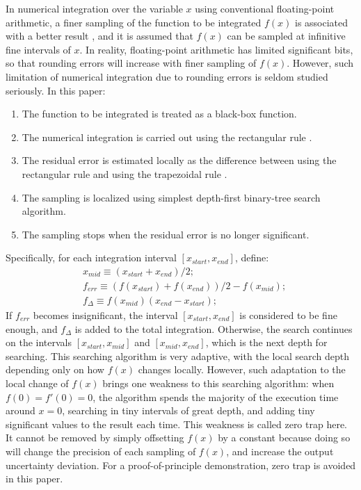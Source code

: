 \documentclass[twoside]{article}
\numberwithin{equation}{section}
\begin{document}
In numerical integration over the variable $x$ using conventional floating-point arithmetic, a finer sampling of the function to be integrated $f(x)$ is associated with a better result \cite{Numerical_Recipes}, and it is assumed that $f(x)$ can be sampled at infinitive fine intervals of $x$.  In reality, floating-point arithmetic has limited significant bits, so that rounding errors will increase with finer sampling of $f(x)$.  However, such limitation of numerical integration due to rounding errors is seldom studied seriously. In this paper:
\begin{enumerate}
\item The function to be integrated is treated as a black-box function.
\item The numerical integration is carried out using the rectangular rule \cite{Numerical_Recipes}.
\item The residual error is estimated locally as the difference between using the rectangular rule and using the trapezoidal rule \cite{Numerical_Recipes}.
\item The sampling is localized using simplest depth-first binary-tree search algorithm.
\item The sampling stops when the residual error is no longer significant.
\end{enumerate}

Specifically, for each integration interval $[x_{start}, x_{end}]$, define:
\begin{align}
& x_{mid} \equiv (x_{start} + x_{end})/2; \\
& f_{err} \equiv (f(x_{start}) + f(x_{end}))/2 - f(x_{mid}); \\
\label{eqn: integration delta}
& f_{\Delta} \equiv f(x_{mid}) (x_{end} - x_{start});
\end{align}
If $f_{err}$ becomes insignificant, the interval $[x_{start}, x_{end}]$ is considered to be fine enough, and $f_{\Delta}$ is added to the total integration.  Otherwise, the search continues on the intervals $[x_{start}, x_{mid}]$ and $[x_{mid}, x_{end}]$, which is the next depth for searching.  This searching algorithm is very adaptive, with the local search depth depending only on how $f(x)$ changes locally.  However, such adaptation to the local change of $f(x)$ brings one weakness to this searching algorithm: when $f(0)=f'(0)=0$, the algorithm spends the majority of the execution time around $x=0$, searching in tiny intervals of great depth, and adding tiny significant values to the result each time.  This weakness is called zero trap here.  It cannot be removed by simply offsetting $f(x)$ by a constant because doing so will change the precision of each sampling of $f(x)$, and increase the output uncertainty deviation.  For a proof-of-principle demonstration, zero trap is avoided in this paper.
\end{document}
